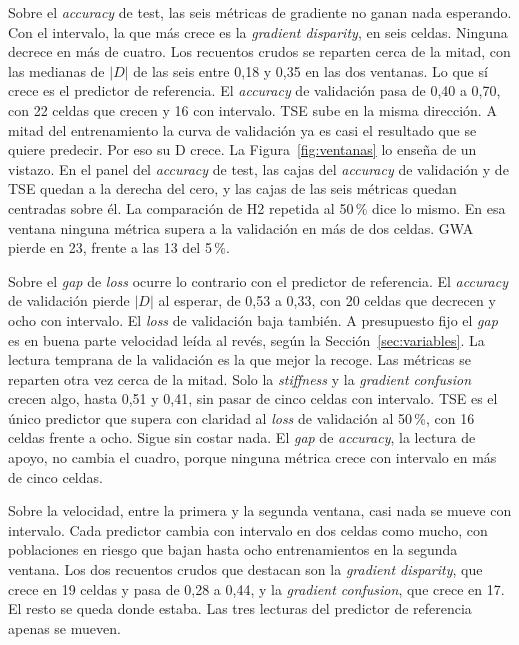 Sobre el \emph{accuracy} de test, las seis métricas de gradiente no ganan nada esperando. Con el intervalo, la que más crece es la \emph{gradient disparity}, en seis celdas. Ninguna decrece en más de cuatro. Los recuentos crudos se reparten cerca de la mitad, con las medianas de $|D|$ de las seis entre 0,18 y 0,35 en las dos ventanas. Lo que sí crece es el predictor de referencia. El \emph{accuracy} de validación pasa de 0,40 a 0,70, con 22 celdas que crecen y 16 con intervalo. TSE sube en la misma dirección. A mitad del entrenamiento la curva de validación ya es casi el resultado que se quiere predecir. Por eso su D crece. La Figura~\ref{fig:ventanas} lo enseña de un vistazo. En el panel del \emph{accuracy} de test, las cajas del \emph{accuracy} de validación y de TSE quedan a la derecha del cero, y las cajas de las seis métricas quedan centradas sobre él. La comparación de H2 repetida al 50\,\% dice lo mismo. En esa ventana ninguna métrica supera a la validación en más de dos celdas. GWA pierde en 23, frente a las 13 del 5\,\%.

Sobre el \emph{gap} de \emph{loss} ocurre lo contrario con el predictor de referencia. El \emph{accuracy} de validación pierde $|D|$ al esperar, de 0,53 a 0,33, con 20 celdas que decrecen y ocho con intervalo. El \emph{loss} de validación baja también. A presupuesto fijo el \emph{gap} es en buena parte velocidad leída al revés, según la Sección~\ref{sec:variables}. La lectura temprana de la validación es la que mejor la recoge. Las métricas se reparten otra vez cerca de la mitad. Solo la \emph{stiffness} y la \emph{gradient confusion} crecen algo, hasta 0,51 y 0,41, sin pasar de cinco celdas con intervalo. TSE es el único predictor que supera con claridad al \emph{loss} de validación al 50\,\%, con 16 celdas frente a ocho. Sigue sin costar nada. El \emph{gap} de \emph{accuracy}, la lectura de apoyo, no cambia el cuadro, porque ninguna métrica crece con intervalo en más de cinco celdas.

Sobre la velocidad, entre la primera y la segunda ventana, casi nada se mueve con intervalo. Cada predictor cambia con intervalo en dos celdas como mucho, con poblaciones en riesgo que bajan hasta ocho entrenamientos en la segunda ventana. Los dos recuentos crudos que destacan son la \emph{gradient disparity}, que crece en 19 celdas y pasa de 0,28 a 0,44, y la \emph{gradient confusion}, que crece en 17. El resto se queda donde estaba. Las tres lecturas del predictor de referencia apenas se mueven.

